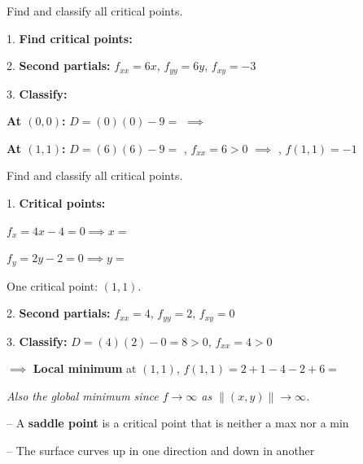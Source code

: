 \documentclass[11pt]{article}
\begin{document}
\begin{example}[$f(x,y) = x^3 + y^3 - 3xy$]
Find and classify all critical points.

1. \textbf{Find critical points:}


2. \textbf{Second partials:} $f_{xx} = 6x$, \; $f_{yy} = 6y$, \; $f_{xy} = -3$

3. \textbf{Classify:}

\textbf{At $(0,0)$:} $D = (0)(0) - 9 = $  $\implies$ 

\textbf{At $(1,1)$:} $D = (6)(6) - 9 = $ , $f_{xx} = 6 > 0$ $\implies$ , $f(1,1) = -1$
\end{example}

\begin{example}[$f(x,y) = 2x^2 + y^2 - 4x - 2y + 6$]
Find and classify all critical points.

1. \textbf{Critical points:}

$f_x = 4x - 4 = 0 \implies x = $ 

$f_y = 2y - 2 = 0 \implies y = $ 

One critical point: $(1,1)$.

2. \textbf{Second partials:} $f_{xx} = 4$, \; $f_{yy} = 2$, \; $f_{xy} = 0$

3. \textbf{Classify:} $D = (4)(2) - 0 = 8 > 0$, \; $f_{xx} = 4 > 0$

$\implies$ \textbf{Local minimum} at $(1,1)$, \; $f(1,1) = 2+1-4-2+6 = $ 

\textit{Also the global minimum since $f \to \infty$ as $\|(x,y)\| \to \infty$.}
\end{example}


-- A \textbf{saddle point} is a critical point that is neither a max nor a min

-- The surface curves up in one direction and down in another
\end{document}
